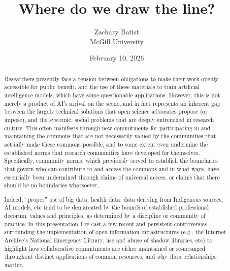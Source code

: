 \documentclass[
  canadian,
]{article}
\title{Where do we draw the line?}
\author{
      {Zachary
Batist \orcidlink{0000-0003-0435-508X} \href{mailto:zachary.batist@mcgill.ca}{\Letter}} \\
          McGill University
     \\
  }
\date{February 10, 2026}
\begin{document}
\maketitle
\begin{abstract}
Researchers presently face a tension between obligations to make their
work openly accessible for public benefit, and the use of these
materials to train artificial intelligence models, which have some
questionable applications. However, this is not merely a product of AI's
arrival on the scene, and in fact represents an inherent gap between the
largely technical solutions that open science advocates propose (or
impose), and the systemic, social problems that are deeply entrenched in
research culture. This often manifests through new commitments for
participating in and maintaining the commons that are not necessarily
valued by the communities that actually make these commons possible, and
to some extent even undermine the established norms that research
communities have developed for themselves. Specifically, community
norms, which previously served to establish the boundaries that govern
who can contribute to and access the commons and in what ways, have
essentially been undermined through claims of universal access, or
claims that there should be no boundaries whatsoever.

Indeed, ``proper'' use of big data, health data, data deriving from
Indigenous sources, AI models, etc tend to be demarcated by the bounds
of established professional decorum, values and principles, as
determined by a discipline or community of practice. In this
presentation I re-cast a few recent and persistent controversies
surrounding the implementation of open information infrastructures
(e.g., the Internet Archive's National Emergency Library, use and abuse
of shadow libraries, etc) to highlight how collaborative commitments are
either maintained or re-arranged throughout distinct applications of
common resources, and why these relationships matter.
\end{abstract}
\end{document}
